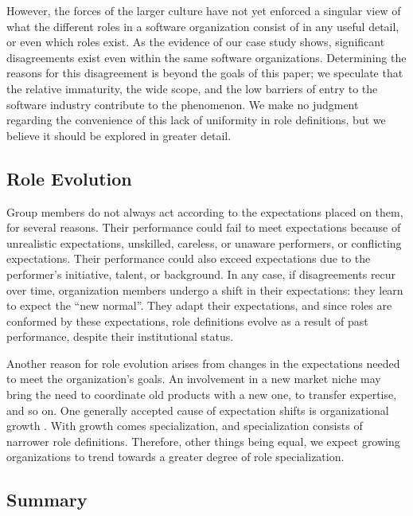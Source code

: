 \documentclass[10pt, conference, compsocconf]{IEEEtran}
\begin{document}
However, the forces of the larger culture have not yet enforced a singular view of what the different roles in a software organization consist of in any useful detail, or even which roles exist. As the evidence of our case study shows, significant disagreements exist even within the same software organizations. Determining the reasons for this disagreement is beyond the goals of this paper; we speculate that the relative immaturity, the wide scope, and the low barriers of entry to the software industry contribute to the phenomenon. We make no judgment regarding the convenience of this lack of uniformity in role definitions, but we believe it should be explored in greater detail.


\subsection{Role Evolution}

Group members do not always act according to the expectations placed on them, for several reasons. Their performance could fail to meet expectations because of unrealistic expectations, unskilled, careless, or unaware performers, or conflicting expectations. Their performance could also exceed expectations due to the performer's initiative, talent, or background. In any case, if disagreements recur over time, organization members undergo a shift in their expectations: they learn to expect the ``new normal''. They adapt their expectations, and since roles are conformed by these expectations, role definitions evolve as a result of past performance, despite their institutional status.

Another reason for role evolution arises from changes in the expectations needed to meet the organization's goals. An involvement in a new market niche may bring the need to coordinate old products with a new one, to transfer expertise, and so on. One generally accepted cause of expectation shifts is organizational growth \cite{Blau1971,Haveman1993}. With growth comes specialization, and specialization consists of narrower role definitions. Therefore, other things being equal, we expect growing organizations to trend towards a greater degree of role specialization.


\subsection{Summary}
\end{document}
